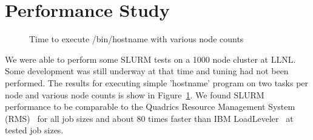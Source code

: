 \section{Performance Study}

\begin{figure}[htb]
\centerline{}
\caption{Time to execute /bin/hostname with various node counts}
\label{timing}
\end{figure}

We were able to perform some SLURM tests on a 1000 node cluster at LLNL.
Some development was still underway at that time and
tuning had not been performed. The results for executing simple 'hostname' program
on two tasks per node and various node counts is show
in Figure~\ref{timing}. We found SLURM performance to be comparable
to the Quadrics Resource Management System (RMS)~\cite{RMS}
for all job sizes and about 80 times faster than IBM
LoadLeveler~\cite{LoadLevelerWeb,LoadLevelerManual} at tested job sizes.
